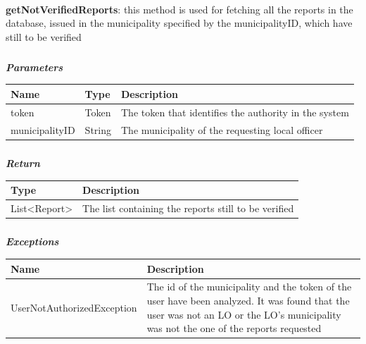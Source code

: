 					\paragraph{}
							\textbf{getNotVerifiedReports}: this method is used for fetching all the reports in the
database, issued in the municipality specified by the municipalityID, which have still to be verified
							\subparagraph{}
							\textit{\textbf{Parameters}}
								\begin{table}[!h]
									\begin{tabular}{L{0.2\textwidth}L{0.2\textwidth}L{0.2\textwidth}}
										\toprule
										Name & Type & Description \\
										\midrule
								  		token & Token & The token that identifies the authority in the system \\
								  		municipalityID & String & The municipality of the requesting local officer \\
								 		\bottomrule
									\end{tabular}
								\end{table}
							\subparagraph{}
								\textit{\textbf{Return}}
									\begin{table}[!h]
									\begin{tabular}{L{0.3\textwidth}L{0.3\textwidth}}
										\toprule
										Type & Description \\
										\midrule
								  		List<Report> & The list containing the reports still to be verified \\
								 		\bottomrule
									\end{tabular}
								\end{table}
							\subparagraph{}
								\textit{\textbf{Exceptions}}
									\begin{table}[!h]
									\begin{tabular}{L{0.3\textwidth}L{0.3\textwidth}}
										\toprule
										Name & Description \\
										\midrule
										UserNotAuthorizedException & The id of the municipality and the token of the user have been analyzed. It was found that the user was not an LO or the LO's municipality was not the one of the reports requested \\
								 		\bottomrule
									\end{tabular}
								\end{table}
								
